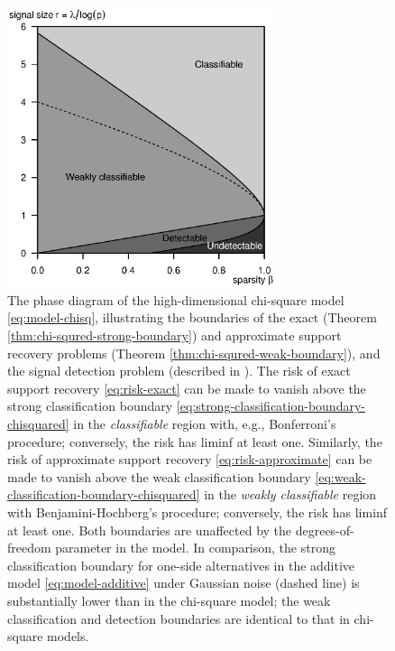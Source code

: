 \begin{figure}
      \centering
      \includegraphics[width=0.7\textwidth]{./phase_diagram_chisquared.eps}
      \caption{The phase diagram of the high-dimensional chi-square model \eqref{eq:model-chisq}, illustrating the boundaries of the exact (Theorem \ref{thm:chi-squred-strong-boundary}) and approximate support recovery problems (Theorem \ref{thm:chi-squred-weak-boundary}), and the signal detection problem (described in \citep{donoho2004higher}). 
      The risk of exact support recovery \eqref{eq:risk-exact} can be made to vanish above the strong classification boundary \eqref{eq:strong-classification-boundary-chisquared} in the \emph{classifiable} region with, e.g., Bonferroni's procedure; conversely, the risk has liminf at least one.
      Similarly, the risk of approximate support recovery \eqref{eq:risk-approximate} can be made to vanish above the weak classification boundary \eqref{eq:weak-classification-boundary-chisquared} in the \emph{weakly classifiable} region with Benjamini-Hochberg's procedure; conversely, the risk has liminf at least one.
      Both boundaries are unaffected by the degrees-of-freedom parameter in the model.
      In comparison, the strong classification boundary for one-side alternatives in the additive model \eqref{eq:model-additive} under Gaussian noise (dashed line) is substantially lower than in the chi-square model; the weak classification and detection boundaries are identical to that in chi-square models.} 
      \label{fig:phase-chi-squared}
\end{figure}


